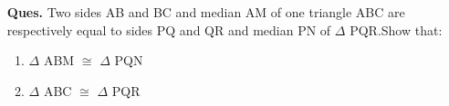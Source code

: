

\begin{enumerate}
		\item[\textbf{Ques.}] 
		{ Two sides AB and BC and median AM of one
		triangle ABC are respectively equal to sides PQ
		and QR and median PN of $\Delta$ PQR.Show that:}

	\begin{enumerate}
		\item$\Delta$ ABM $\cong$ $\Delta$ PQN  
		\item$\Delta$ ABC $\cong$ $\Delta$ PQR
	\end{enumerate}	
\end{enumerate}

